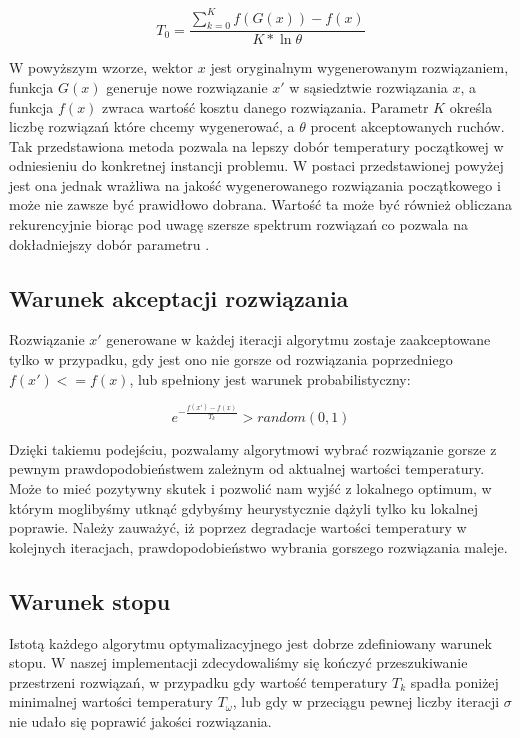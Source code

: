 \begin{equation}
	T_0 = \frac{\sum_{k=0}^{K} f(G(x)) - f(x)}{K * \ln \theta}
\end{equation}

W powyższym wzorze, wektor $x$ jest oryginalnym wygenerowanym rozwiązaniem, funkcja $G(x)$ generuje nowe rozwiązanie $x'$ w sąsiedztwie rozwiązania $x$, a funkcja $f(x)$ zwraca wartość kosztu danego rozwiązania. Parametr $K$ określa liczbę rozwiązań które chcemy wygenerować, a $\theta$ procent akceptowanych ruchów. Tak przedstawiona metoda pozwala na lepszy dobór temperatury początkowej w odniesieniu do konkretnej instancji problemu. W postaci przedstawionej powyżej jest ona jednak wrażliwa na jakość wygenerowanego rozwiązania początkowego i może nie zawsze być prawidłowo dobrana. Wartość ta może być również obliczana rekurencyjnie biorąc pod uwagę szersze spektrum rozwiązań co pozwala na dokładniejszy dobór parametru \cite{saTemperature}. 


\subsection{Warunek akceptacji rozwiązania}
Rozwiązanie $x'$ generowane w każdej iteracji algorytmu zostaje zaakceptowane tylko w przypadku, gdy jest ono nie gorsze od rozwiązania poprzedniego $f(x') <= f(x)$, lub spełniony jest warunek probabilistyczny:

\begin{equation}
	e^{-\frac{f(x') - f(x)}{T_k}} > random(0, 1)
\end{equation} 

Dzięki takiemu podejściu, pozwalamy algorytmowi wybrać rozwiązanie gorsze z pewnym prawdopodobieństwem zależnym od aktualnej wartości temperatury. Może to mieć pozytywny skutek i pozwolić nam wyjść z lokalnego optimum, w którym moglibyśmy utknąć gdybyśmy heurystycznie dążyli tylko ku lokalnej poprawie. Należy zauważyć, iż poprzez degradacje wartości temperatury w kolejnych iteracjach, prawdopodobieństwo wybrania gorszego rozwiązania maleje.


\subsection{Warunek stopu}
Istotą każdego algorytmu optymalizacyjnego jest dobrze zdefiniowany warunek stopu. W naszej implementacji zdecydowaliśmy się kończyć przeszukiwanie przestrzeni rozwiązań, w przypadku gdy wartość temperatury $T_k$ spadła poniżej minimalnej wartości temperatury $T_\omega$, lub gdy w przeciągu pewnej liczby iteracji $\sigma$ nie udało się poprawić jakości rozwiązania. 


